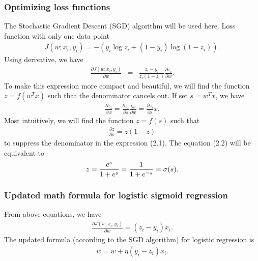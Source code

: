 \subsubsection{Optimizing loss functions}
\hspace{0.5cm}The Stochastic Gradient Descent (SGD) algorithm will be used here. Loss function with only one data point
\begin{align*}
	J(w; x_i, y_i) = -(y_i \log {z}_i + (1-y_i) \log (1 - {z}_i)).
\end{align*}
\hspace{0.5cm}Using derivative, we have
\begin{eqnarray}
	\frac{\partial J(w; x_i, y_i)}{\partial w} 
	&=& \frac{z_i - y_i}{z_i(1 - z_i)} \frac{\partial z_i}{\partial w} .
\end{eqnarray}
\hspace{0.5cm}To make this expression more compact and beautiful, we will find the function 
$z = f(w^T x)$ such that the denominator cancels out. If set $s = w^T x$, we have
\begin{align*}
	\frac{\partial z_i}{\partial w} = \frac{\partial z_i}{\partial s} \frac{\partial s}{\partial w} = \frac{\partial z_i}{\partial s} x  .
\end{align*}
\hspace{0.5cm}Most intuitively, we will find the function $z = f(s)$ such that
\begin{align}
	\frac{\partial z}{\partial s} = z(1 - z)
\end{align}
to suppress the denominator in the expression (2.1). The equation (2.2) will be equivalent to
\begin{align}
	z = \frac{e^s}{1 +e^s} = \frac{1}{1 + e^{-s}} = \sigma(s) \notag .
\end{align}

\subsubsection{Updated math formula for logistic sigmoid regression}
\hspace{0.5cm}From above equations, we have
\begin{align*}
    \frac{\partial J(w; x_i, y_i)}{\partial w} = (z_i - y_i)x_i. 
\end{align*}
\hspace{0.5cm}The updated formula (according to the SGD algorithm) for logistic regression is
\begin{align*}
    w = w + \eta(y_i - z_i)x_i.
\end{align*}


